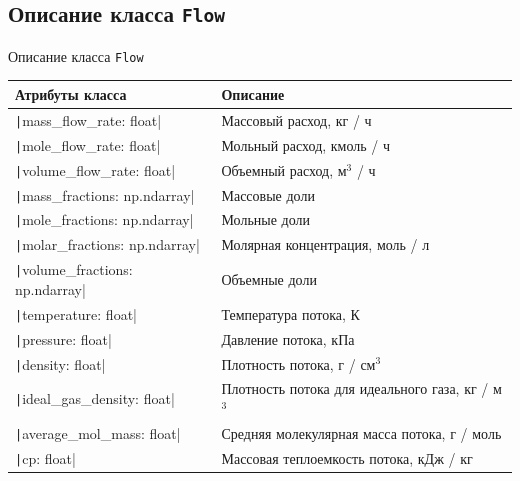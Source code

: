 \documentclass[aspectratio=169, mathserif]{beamer}%
\begin{document}
\subsection{Описание класса \texttt{Flow}}
\begin{frame}[fragile, label=c]{Описание класса \texttt{Flow}}
\scriptsize
\begin{table}[h!]
	\centering
	\renewcommand{\arraystretch}{1.2}
	\begin{tabular}{|p{.49\linewidth}|p{.49\linewidth}|}
		\hline
		\textbf{Атрибуты класса} & \textbf{Описание}  \\
		\hline
		\texttt|mass_flow_rate: float| & Массовый расход, кг / ч \\
		\hline
		\texttt|mole_flow_rate: float| & Мольный расход, кмоль / ч \\
		\hline
		\texttt|volume_flow_rate: float| & Объемный расход, м$^3$ / ч \\
		\hline
		\texttt|mass_fractions: np.ndarray| & Массовые доли \\
		\hline
		\texttt|mole_fractions: np.ndarray| & Мольные доли \\
		\hline
		\cellcolor{blue!25} \texttt|molar_fractions: np.ndarray| & \cellcolor{blue!25} Молярная концентрация, моль / л \\
		\hline
		\texttt|volume_fractions: np.ndarray| & Объемные доли \\
		\hline
		\texttt|temperature: float| & Температура потока, К \\
		\hline
		\cellcolor{blue!25} \texttt|pressure: float| & \cellcolor{blue!25} Давление потока, кПа \\
		\hline
		\texttt|density: float| & Плотность потока, г / см$^3$ \\
		\hline
		\cellcolor{blue!25} \texttt|ideal_gas_density: float| & \cellcolor{blue!25} Плотность потока для идеального газа, кг / м$^3$ \\
		\hline
		\texttt|average_mol_mass: float| & Средняя молекулярная масса потока, г / моль \\
		\hline
		\texttt|cp: float| & Массовая теплоемкость потока, кДж / кг \\
		\hline
	\end{tabular}
\end{table}
\vfill
\end{frame}
\end{document}
